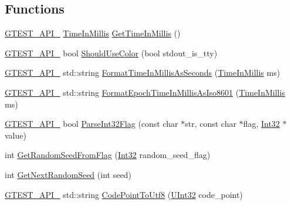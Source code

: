 \subsection*{Functions}
\begin{DoxyCompactItemize}
\item 
\hyperlink{gtest-port_8h_aa73be6f0ba4a7456180a94904ce17790}{G\-T\-E\-S\-T\-\_\-\-A\-P\-I\-\_\-} \hyperlink{namespacetesting_1_1internal_a5eed833eddf9ea8ca45546c125f4ef0c}{Time\-In\-Millis} \hyperlink{namespacetesting_1_1internal_ae66b46943a429e6efb1db456d4cae90c}{Get\-Time\-In\-Millis} ()
\item 
\hyperlink{gtest-port_8h_aa73be6f0ba4a7456180a94904ce17790}{G\-T\-E\-S\-T\-\_\-\-A\-P\-I\-\_\-} bool \hyperlink{namespacetesting_1_1internal_ac1db1b4603967a6c4404f31cbbac31a6}{Should\-Use\-Color} (bool stdout\-\_\-is\-\_\-tty)
\item 
\hyperlink{gtest-port_8h_aa73be6f0ba4a7456180a94904ce17790}{G\-T\-E\-S\-T\-\_\-\-A\-P\-I\-\_\-} std\-::string \hyperlink{namespacetesting_1_1internal_a904485f27a54be8a5a92856e2d838797}{Format\-Time\-In\-Millis\-As\-Seconds} (\hyperlink{namespacetesting_1_1internal_a5eed833eddf9ea8ca45546c125f4ef0c}{Time\-In\-Millis} ms)
\item 
\hyperlink{gtest-port_8h_aa73be6f0ba4a7456180a94904ce17790}{G\-T\-E\-S\-T\-\_\-\-A\-P\-I\-\_\-} std\-::string \hyperlink{namespacetesting_1_1internal_a5ef227c4a610e7ff638b12dfb25b068e}{Format\-Epoch\-Time\-In\-Millis\-As\-Iso8601} (\hyperlink{namespacetesting_1_1internal_a5eed833eddf9ea8ca45546c125f4ef0c}{Time\-In\-Millis} ms)
\item 
\hyperlink{gtest-port_8h_aa73be6f0ba4a7456180a94904ce17790}{G\-T\-E\-S\-T\-\_\-\-A\-P\-I\-\_\-} bool \hyperlink{namespacetesting_1_1internal_ae3449e173767750b613114ceac6d916a}{Parse\-Int32\-Flag} (const char $\ast$str, const char $\ast$flag, \hyperlink{namespacetesting_1_1internal_af89e21e4043b5cf0c120af487b24fa06}{Int32} $\ast$value)
\item 
int \hyperlink{namespacetesting_1_1internal_ae74fedbdaebaac8d1202192266243b9e}{Get\-Random\-Seed\-From\-Flag} (\hyperlink{namespacetesting_1_1internal_af89e21e4043b5cf0c120af487b24fa06}{Int32} random\-\_\-seed\-\_\-flag)
\item 
int \hyperlink{namespacetesting_1_1internal_a6e07a655cb987d131cd8fbeba9a7f1eb}{Get\-Next\-Random\-Seed} (int seed)
\item 
\hyperlink{gtest-port_8h_aa73be6f0ba4a7456180a94904ce17790}{G\-T\-E\-S\-T\-\_\-\-A\-P\-I\-\_\-} std\-::string \hyperlink{namespacetesting_1_1internal_a0c0f9558efb9abb965851c4738cdc725}{Code\-Point\-To\-Utf8} (\hyperlink{namespacetesting_1_1internal_a436defbb8e92c8e94e33ebcc86f278ba}{U\-Int32} code\-\_\-point)

\end{DoxyCompactItemize}
